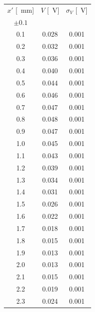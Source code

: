\documentclass[10pt,oneside,a4paper]{article}
\begin{document}
\vspace{1cm}

\label{tab:interaFenditura}
\begin{minipage}{0.33\linewidth}
\begin{center}
\begin{tabular}{c|c|c}
$x'$ [\SI{}{mm}] & $V$ [\SI{}{V}] & $\sigma_V$ [\SI{}{V}] \\
 $\pm 0.1$ & & \\
\hline
 0.1 & 0.028 & 0.001 \\
  0.2 & 0.032 & 0.001 \\
  0.3 & 0.036 & 0.001 \\
  0.4 & 0.040 & 0.001 \\
  0.5 & 0.044 & 0.001 \\
  0.6 & 0.046 & 0.001 \\
  0.7 & 0.047 & 0.001 \\
  0.8 & 0.048 & 0.001 \\
  0.9 & 0.047 & 0.001 \\
  1.0 & 0.045 & 0.001 \\
  1.1 & 0.043 & 0.001 \\
  1.2 & 0.039 & 0.001 \\
  1.3 & 0.034 & 0.001 \\
  1.4 & 0.031 & 0.001 \\
  1.5 & 0.026 & 0.001 \\
  1.6 & 0.022 & 0.001 \\
  1.7 & 0.018 & 0.001 \\
  1.8 & 0.015 & 0.001 \\
  1.9 & 0.013 & 0.001 \\
  2.0 & 0.013 & 0.001 \\
  2.1 & 0.015 & 0.001 \\
  2.2 & 0.019 & 0.001 \\
  2.3 & 0.024 & 0.001 \\
\hline
\end{tabular}
\end{center}
\end{minipage}
\end{document}
